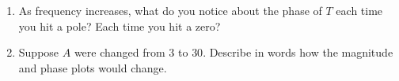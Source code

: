\documentclass[11pt]{article}
\begin{document}
\begin{problem}
\begin{enumerate}[\alph*)]
\begin{itemize}
\item

Continue increasing frequency, identifying the phase of $T$ in each region until you have a
complete graph

\end{itemize}

\item

As frequency increases, what do you notice about the phase of $T$ each time you hit a pole? Each
time you hit a zero?

\item

Suppose $A$ were changed from $3$ to $30$. Describe in words how the magnitude and phase plots
would change.

\end{enumerate}

\end{problem}

\pagebreak

\begin{soln}
\end{soln}
\end{document}
